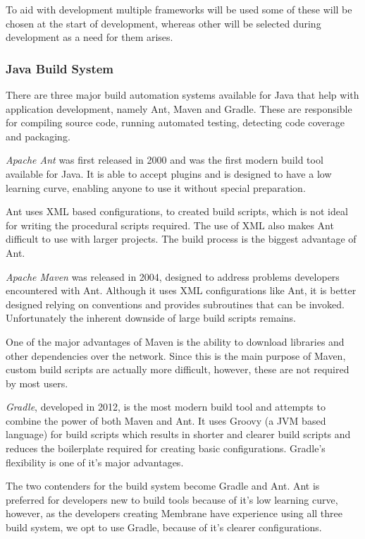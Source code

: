 \documentclass[11pt, a4paper, twocolumn, twoside]{report}
\begin{document}
To aid with development multiple frameworks will be used some of these will be chosen at the start of development, whereas other will be selected during development as a need for them arises.

\subsubsection{Java Build System}

There are three major build automation systems available for Java that help with application development, namely Ant, Maven and Gradle. These are responsible for compiling source code, running automated testing, detecting code coverage and packaging.

\emph{Apache Ant} was first released in 2000 and was the first modern build tool available for Java. It is able to accept plugins and is designed to have a low learning curve, enabling anyone to use it without special preparation.

Ant uses XML based configurations, to created build scripts, which is not ideal for writing the procedural scripts required. The use of XML also makes Ant difficult to use with larger projects. The build process is the biggest advantage of Ant.

\emph{Apache Maven} was released in 2004, designed to address problems developers encountered with Ant. Although it uses XML configurations like Ant, it is better designed relying on conventions and provides subroutines that can be invoked. Unfortunately the inherent downside of large build scripts remains.

One of the major advantages of Maven is the ability to download libraries and other dependencies over the network. Since this is the main purpose of Maven, custom build scripts are actually more difficult, however, these are not required by most users. \citep{viktor2014buildtools}

\emph{Gradle}, developed in 2012, is the most modern build tool and attempts to combine the power of both Maven and Ant. It uses Groovy (a JVM based language) for build scripts which results in shorter and clearer build scripts and reduces the boilerplate required for creating basic configurations. \citep{gradle2017comparison} Gradle's flexibility is one of it's major advantages. \citep{casperson2014comparison}

The two contenders for the build system become Gradle and Ant. Ant is preferred for developers new to build tools because of it's low learning curve, however, as the developers creating Membrane have experience using all three build system, we opt to use Gradle, because of it's clearer configurations.
\end{document}
